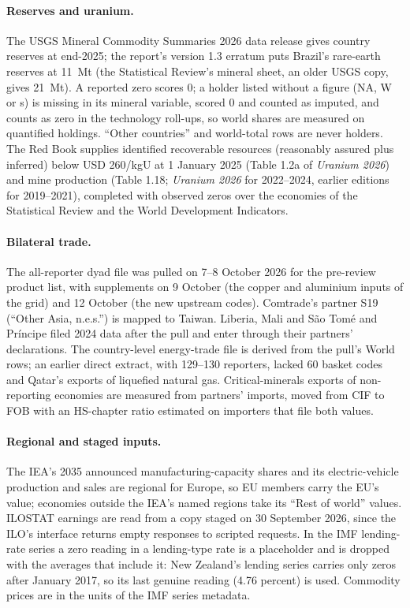 \paragraph{Reserves and uranium.} The USGS Mineral Commodity Summaries 2026 data release
\citep{usgs2026mcs} gives country reserves at end-2025; the report's version 1.3 erratum puts
Brazil's rare-earth reserves at 11~Mt (the Statistical Review's mineral sheet, an older USGS copy,
gives 21~Mt). A reported zero scores 0; a holder listed without a figure (NA, W or s) is missing in
its mineral variable, scored 0 and counted as imputed, and counts as zero in the technology
roll-ups, so world shares are measured on quantified holdings. ``Other countries'' and world-total
rows are never holders. The Red Book \citep{oecdnea2026uranium} supplies identified recoverable
resources (reasonably assured plus inferred) below USD 260/kgU at 1 January 2025 (Table 1.2a of
\emph{Uranium 2026}) and mine production (Table 1.18; \emph{Uranium 2026} for 2022--2024, earlier
editions for 2019--2021), completed with observed zeros over the economies of the Statistical
Review and the World Development Indicators.

\paragraph{Bilateral trade.} The all-reporter dyad file was pulled on 7--8 October 2026 for the
pre-review product list, with supplements on 9 October (the copper and aluminium inputs of the grid)
and 12 October (the new upstream codes). Comtrade's partner S19 (``Other Asia, n.e.s.'') is mapped
to Taiwan. Liberia, Mali and S\~ao Tom\'e and Pr\'incipe filed 2024 data after the pull and enter
through their partners' declarations. The country-level energy-trade file is derived from the
pull's World rows; an earlier direct extract, with 129--130 reporters, lacked 60 basket codes and
Qatar's exports of liquefied natural gas. Critical-minerals exports of non-reporting economies are
measured from partners' imports, moved from CIF to FOB with an HS-chapter ratio estimated on
importers that file both values.

\paragraph{Regional and staged inputs.} The IEA's 2035 announced manufacturing-capacity shares and
its electric-vehicle production and sales are regional for Europe, so EU members carry the EU's
value; economies outside the IEA's named regions take its ``Rest of world'' values. ILOSTAT
earnings are read from a copy staged on 30 September 2026, since the ILO's interface returns empty
responses to scripted requests. In the IMF lending-rate series a zero reading in a lending-type
rate is a placeholder and is dropped with the averages that include it: New Zealand's lending series
carries only zeros after January 2017, so its last genuine reading (4.76 percent) is used. Commodity
prices are in the units of the IMF series metadata.

